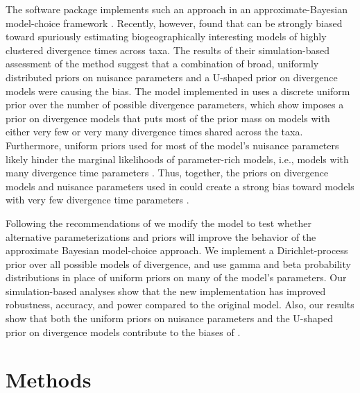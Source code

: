 \documentclass[letterpaper,12pt]{article}
\begin{document}
\begin{linenumbers}
The software package \msb implements such an approach in an
approximate-Bayesian model-choice framework \citep{Hickerson2006,Huang2011}.
Recently, however, \citet{Oaks2012} found that \msb can be strongly biased
toward spuriously estimating biogeographically interesting models of highly
clustered divergence times across taxa.
The results of their simulation-based assessment of the method suggest that a
combination of broad, uniformly distributed priors on nuisance parameters and a
U-shaped prior on divergence models were causing the bias.
The model implemented in \msb uses a discrete uniform prior over the number of
possible divergence parameters, which \citet{Oaks2012} show imposes a prior on
divergence models that puts most of the prior mass on models with either very
few or very many divergence times shared across the taxa.
Furthermore, uniform priors used for most of the model's nuisance parameters
likely hinder the marginal likelihoods of parameter-rich models, i.e., models
with many divergence time parameters \citep[this is often referred to as
Lindley's paradox;][]{Lindley1957}.
Thus, together, the priors on divergence models and nuisance parameters used in
\msb could create a strong bias toward models with very few divergence time
parameters \citep{Oaks2012}.

Following the recommendations of \citet{Oaks2012} we modify the \msb model to
test whether alternative parameterizations and priors will improve the behavior
of the approximate Bayesian model-choice approach.
We implement a Dirichlet-process prior over all possible models of divergence,
and use gamma and beta probability distributions in place of uniform priors on
many of the model's parameters.
Our simulation-based analyses show that the new implementation has improved
robustness, accuracy, and power compared to the original model.
Also, our results show that both the uniform priors on nuisance parameters and
the U-shaped prior on divergence models contribute to the biases of \msb.


\section*{Methods}


\end{linenumbers}
\end{document}
